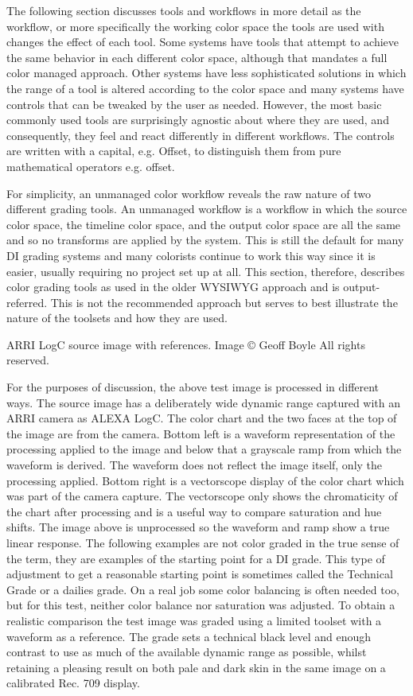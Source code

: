 The following section discusses tools and workflows in more detail as the workflow, or more specifically the working color space the tools are used with changes the effect of each tool. Some systems have tools that attempt to achieve the same behavior in each different color space, although that mandates a full color managed approach. Other systems have less sophisticated solutions in which the range of a tool is altered according to the color space and many systems have controls that can be tweaked by the user as needed. However, the most basic commonly used tools are surprisingly agnostic about where they are used, and consequently, they feel and react differently in different workflows. The controls are written with a capital, e.g. Offset, to distinguish them from pure mathematical operators e.g. offset.

For simplicity, an unmanaged color workflow reveals the raw nature of two different grading tools. An unmanaged workflow is a workflow in which the source color space, the timeline color space, and the output color space are all the same and so no transforms are applied by the system. This is still the default for many DI grading systems and many colorists continue to work this way since it is easier, usually requiring no project set up at all. This section, therefore, describes color grading tools as used in the older WYSIWYG approach and is output-referred. This is not the recommended approach but serves to best illustrate the nature of the toolsets and how they are used.


ARRI LogC source image with references. Image © Geoff Boyle All rights reserved.


For the purposes of discussion, the above test image is processed in different ways. The source image has a deliberately wide dynamic range captured with an ARRI camera as ALEXA LogC. The color chart and the two faces at the top of the image are from the camera. Bottom left is a waveform representation of the processing applied to the image and below that a grayscale ramp from which the waveform is derived. The waveform does not reflect the image itself, only the processing applied. Bottom right is a vectorscope display of the color chart which was part of the camera capture. The vectorscope only shows the chromaticity of the chart after processing and is a useful way to compare saturation and hue shifts. The image above is unprocessed so the waveform and ramp show a true linear response. The following examples are not color graded in the true sense of the term, they are examples of the starting point for a DI grade. This type of adjustment to get a reasonable starting point is sometimes called the Technical Grade or a dailies grade. On a real job some color balancing is often needed too, but for this test, neither color balance nor saturation was adjusted. To obtain a realistic comparison the test image was graded using a limited toolset with a waveform as a reference. The grade sets a technical black level and enough contrast to use as much of the available dynamic range as possible, whilst retaining a pleasing result on both pale and dark skin in the same image on a calibrated Rec. 709 display. 

